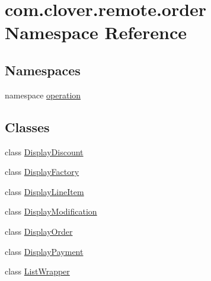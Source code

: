 \hypertarget{namespacecom_1_1clover_1_1remote_1_1order}{}\section{com.\+clover.\+remote.\+order Namespace Reference}
\label{namespacecom_1_1clover_1_1remote_1_1order}
\subsection*{Namespaces}
\begin{DoxyCompactItemize}
\item 
namespace \hyperlink{namespacecom_1_1clover_1_1remote_1_1order_1_1operation}{operation}
\end{DoxyCompactItemize}
\subsection*{Classes}
\begin{DoxyCompactItemize}
\item 
class \hyperlink{classcom_1_1clover_1_1remote_1_1order_1_1_display_discount}{Display\+Discount}
\item 
class \hyperlink{classcom_1_1clover_1_1remote_1_1order_1_1_display_factory}{Display\+Factory}
\item 
class \hyperlink{classcom_1_1clover_1_1remote_1_1order_1_1_display_line_item}{Display\+Line\+Item}
\item 
class \hyperlink{classcom_1_1clover_1_1remote_1_1order_1_1_display_modification}{Display\+Modification}
\item 
class \hyperlink{classcom_1_1clover_1_1remote_1_1order_1_1_display_order}{Display\+Order}
\item 
class \hyperlink{classcom_1_1clover_1_1remote_1_1order_1_1_display_payment}{Display\+Payment}
\item 
class \hyperlink{classcom_1_1clover_1_1remote_1_1order_1_1_list_wrapper}{List\+Wrapper}
\end{DoxyCompactItemize}
